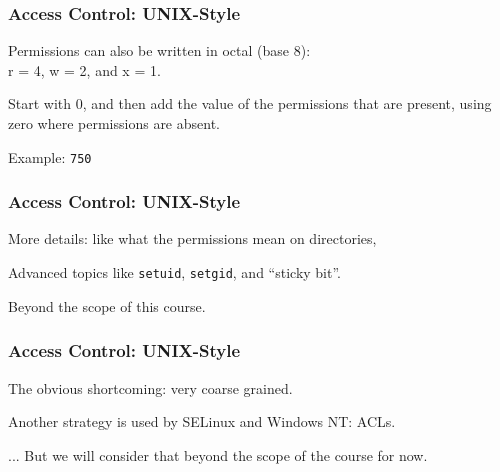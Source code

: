 \begin{frame}
	\frametitle{Access Control: UNIX-Style}


	Permissions can also be written in octal (base 8): \\
	\quad r = 4, w = 2, and x = 1.

	Start with 0, and then add the value of the  permissions that are present, using zero where permissions are absent.

	Example: \texttt{750} 


\end{frame}

\begin{frame}
	\frametitle{Access Control: UNIX-Style}


	More details: like what the permissions mean on directories,

	Advanced topics like \texttt{setuid}, \texttt{setgid}, and ``sticky bit''.

	Beyond the scope of this course.


\end{frame}

\begin{frame}
	\frametitle{Access Control: UNIX-Style}


	The obvious shortcoming: very coarse grained.

	Another strategy is used by SELinux and Windows NT: ACLs.

	... But we will consider that beyond the scope of the course for now.
\end{frame}



